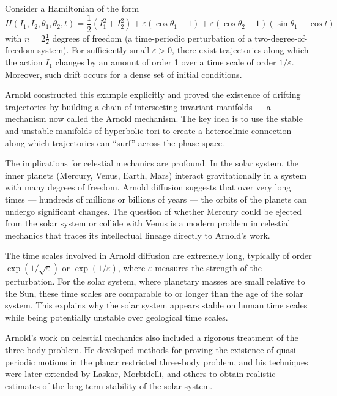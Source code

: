 \begin{theorem}
Consider a Hamiltonian of the form
\[
H(I_1,I_2,\theta_1,\theta_2,t) = \frac{1}{2}(I_1^2 + I_2^2) + \varepsilon(\cos\theta_1 - 1) + \varepsilon(\cos\theta_2 - 1)(\sin\theta_1 + \cos t)
\]
with \(n = 2\frac{1}{2}\) degrees of freedom (a time-periodic perturbation of a two-degree-of-freedom system). For sufficiently small \(\varepsilon > 0\), there exist trajectories along which the action \(I_1\) changes by an amount of order 1 over a time scale of order \(1/\varepsilon\). Moreover, such drift occurs for a dense set of initial conditions.
\end{theorem}

Arnold constructed this example explicitly and proved the existence of drifting trajectories by building a chain of intersecting invariant manifolds --- a mechanism now called the Arnold mechanism. The key idea is to use the stable and unstable manifolds of hyperbolic tori to create a heteroclinic connection along which trajectories can ``surf'' across the phase space.

The implications for celestial mechanics are profound. In the solar system, the inner planets (Mercury, Venus, Earth, Mars) interact gravitationally in a system with many degrees of freedom. Arnold diffusion suggests that over very long times --- hundreds of millions or billions of years --- the orbits of the planets can undergo significant changes. The question of whether Mercury could be ejected from the solar system or collide with Venus is a modern problem in celestial mechanics that traces its intellectual lineage directly to Arnold's work.

The time scales involved in Arnold diffusion are extremely long, typically of order \(\exp(1/\sqrt{\varepsilon})\) or \(\exp(1/\varepsilon)\), where \(\varepsilon\) measures the strength of the perturbation. For the solar system, where planetary masses are small relative to the Sun, these time scales are comparable to or longer than the age of the solar system. This explains why the solar system appears stable on human time scales while being potentially unstable over geological time scales.

Arnold's work on celestial mechanics also included a rigorous treatment of the three-body problem. He developed methods for proving the existence of quasi-periodic motions in the planar restricted three-body problem, and his techniques were later extended by Laskar, Morbidelli, and others to obtain realistic estimates of the long-term stability of the solar system.

